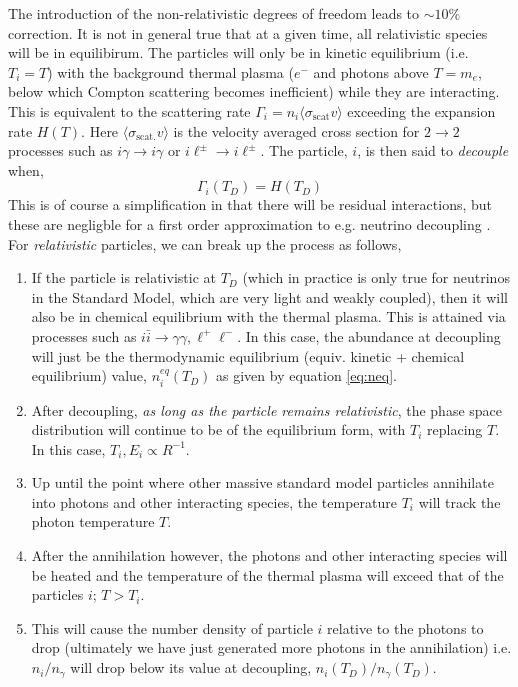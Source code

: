 \documentclass[11pt]{article}
\numberwithin{equation}{section}
\numberwithin{figure}{section}
\numberwithin{table}{section}
\begin{document}
The introduction of the non-relativistic degrees of freedom leads to $\sim 10 \%$ correction. It is not in general true that at a given time, all relativistic species will be in equilibirum. The particles will only be in kinetic equilibrium (i.e. $T_i = T$) with the background thermal plasma ($e^-$ and photons above $T = m_e$, below which Compton scattering becomes inefficient) while they are interacting.  This is equivalent to the scattering rate $\Gamma_i = n_i \langle \sigma_{\mathrm{scat}}v \rangle$ exceeding the expansion rate $H(T)$. Here $\langle \sigma_{\mathrm{scat.}}v \rangle$ is the velocity averaged cross section for $2 \rightarrow 2$ processes such as $i \gamma \rightarrow i \gamma$ or $i \ell^{\pm} \rightarrow i \ell^{\pm}$. The particle, $i$, is then said to \textit{decouple} when,
\begin{equation}
\Gamma_i(T_D) = H(T_D)
\end{equation}
This is of course a simplification in that there will be residual interactions, but these are negligble for a first order approximation to e.g. neutrino decoupling \citep{Dodelson:1992km}. For \textit{relativistic} particles, we can break up the process as follows,
\begin{enumerate}
\item If the particle is relativistic at $T_D$ (which in practice is only true for neutrinos in the Standard Model, which are very light and weakly coupled), then it will also be in chemical equilibrium with the thermal plasma. This is attained via processes such as $i \bar{i} \rightarrow \gamma \gamma, \ell^+ \ell^-$. In this case, the abundance at decoupling will just be the thermodynamic equilibrium (equiv. kinetic + chemical equilibrium) value, $n_i^{eq}(T_D)$ as given by equation \eqref{eq:neq}.
\item After decoupling, \textit{as long as the particle remains relativistic}, the phase space distribution will continue to be of the equilibrium form, with $T_i$ replacing $T$. In this case, $T_i, E_i \propto R^{-1}$.
\item Up until the point where other massive standard model particles annihilate into photons and other interacting species, the temperature $T_i$ will track the photon temperature $T$.
\item After the annihilation however, the photons and other interacting species will be heated and the temperature of the thermal plasma will exceed that of the particles $i$; $T > T_i$.
\item This will cause the number density of particle $i$ relative to the photons to drop (ultimately we have just generated more photons in the annihilation) i.e. $n_i/n_\gamma$ will drop below its value at decoupling, $n_i(T_D)/n_\gamma(T_D)$.
\end{enumerate}
\end{document}
